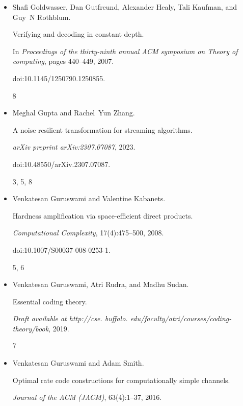 \documentclass[10pt,a4paper]{article}
\begin{document}
\begin{itemize}
doi:10.1561/0400000079.


3




\item[] 
[11]

Shafi Goldwasser, Dan Gutfreund, Alexander Healy, Tali Kaufman, and Guy N
Rothblum.


Verifying and decoding in constant depth.


In \emph{Proceedings of the thirty-ninth annual ACM symposium on
Theory of computing}, pages 440–449, 2007.


doi:10.1145/1250790.1250855.


8




\item[] 
[12]

Meghal Gupta and Rachel Yun Zhang.


A noise resilient transformation for streaming algorithms.


\emph{arXiv preprint arXiv:2307.07087}, 2023.


doi:10.48550/arXiv.2307.07087.


3, 5, 8




\item[] 
[13]

Venkatesan Guruswami and Valentine Kabanets.


Hardness amplification via space-efficient direct products.


\emph{Computational Complexity}, 17(4):475–500, 2008.


doi:10.1007/S00037-008-0253-1.


5, 6




\item[] 
[14]

Venkatesan Guruswami, Atri Rudra, and Madhu Sudan.


Essential coding theory.


\emph{Draft available at http://cse. buffalo.
edu/faculty/atri/courses/coding-theory/book}, 2019.


7




\item[] 
[15]

Venkatesan Guruswami and Adam Smith.


Optimal rate code constructions for computationally simple channels.


\emph{Journal of the ACM (JACM)}, 63(4):1–37, 2016.



\end{itemize}
\end{document}
